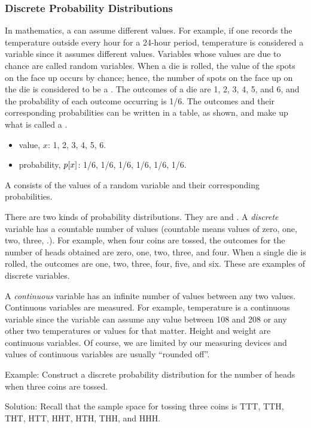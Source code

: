 \subsubsection{Discrete Probability Distributions}
In mathematics, a  can assume different values. For example, if one records the temperature outside every hour for a 24-hour period, temperature is considered a variable since it assumes different values. Variables whose values are due to chance are called random variables. When a die is rolled, the value of the spots on the face up occurs by chance; hence, the number of spots on the face up on the die is considered to be a . The outcomes of a die are 1, 2, 3, 4, 5, and 6, and the probability of each outcome occurring is 1/6. The outcomes and their corresponding probabilities can be written in a table, as shown, and make up what is called a .
\begin{itemize}
\item value, $x$: 1, 2, 3, 4, 5, 6.
\item probability, $p\!\left[{x}\right]$: 1/6, 1/6, 1/6, 1/6, 1/6, 1/6.
\end{itemize}

A  consists of the values of a random variable and their corresponding probabilities.

There are two kinds of probability distributions. They are  and . A \emph{discrete} variable has a countable number of values (countable means values of zero, one, two, three, \etc.). For example, when four coins are tossed, the outcomes for the number of heads obtained are zero, one, two, three, and four. When a single die is rolled, the outcomes are one, two, three, four, five, and six. These are examples of discrete variables.

A \emph{continuous} variable has an infinite number of values between any two values. Continuous variables are measured. For example, temperature is a continuous variable since the variable can assume any value between 108 and 208 or any other two temperatures or values for that matter. Height and weight are continuous variables. Of course, we are limited by our measuring devices and values of continuous variables are usually ``rounded off''.

Example: Construct a discrete probability distribution for the number of heads when three coins are tossed.

Solution: Recall that the sample space for tossing three coins is TTT, TTH, THT, HTT, HHT, HTH, THH, and HHH.

